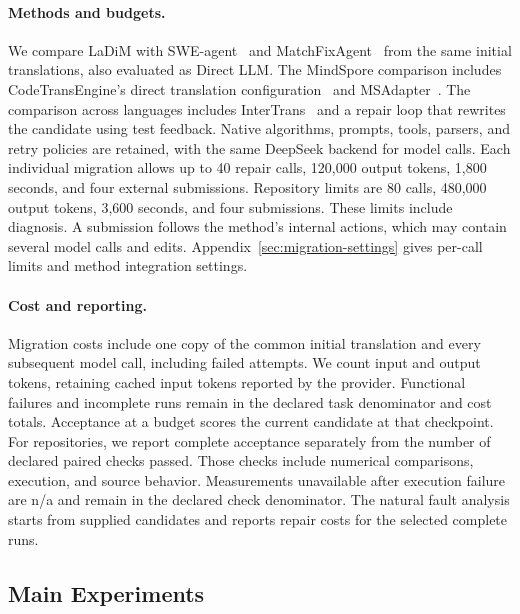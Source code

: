 \documentclass{article}
\begin{document}
\paragraph{Methods and budgets.}
We compare LaDiM with SWE-agent~\citep{yang2024sweagent} and MatchFixAgent~\citep{ibrahimzada2025matchfixagent} from the same initial translations, also evaluated as Direct LLM. The MindSpore comparison includes CodeTransEngine's direct translation configuration~\citep{macedo2025codetransengine} and MSAdapter~\citep{openi2025msadapter}. The comparison across languages includes InterTrans~\citep{macedo2024intertrans} and a repair loop that rewrites the candidate using test feedback. Native algorithms, prompts, tools, parsers, and retry policies are retained, with the same DeepSeek backend for model calls. Each individual migration allows up to 40 repair calls, 120,000 output tokens, 1,800 seconds, and four external submissions. Repository limits are 80 calls, 480,000 output tokens, 3,600 seconds, and four submissions. These limits include diagnosis. A submission follows the method's internal actions, which may contain several model calls and edits. Appendix~\ref{sec:migration-settings} gives per-call limits and method integration settings.

\paragraph{Cost and reporting.}
Migration costs include one copy of the common initial translation and every subsequent model call, including failed attempts. We count input and output tokens, retaining cached input tokens reported by the provider. Functional failures and incomplete runs remain in the declared task denominator and cost totals. Acceptance at a budget scores the current candidate at that checkpoint. For repositories, we report complete acceptance separately from the number of declared paired checks passed. Those checks include numerical comparisons, execution, and source behavior. Measurements unavailable after execution failure are n/a and remain in the declared check denominator. The natural fault analysis starts from supplied candidates and reports repair costs for the selected complete runs.

\subsection{Main Experiments}
\label{sec:main-results}
\end{document}
